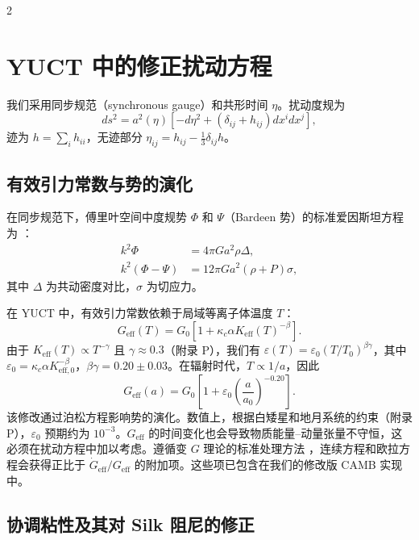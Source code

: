 \documentclass[11pt,a4paper]{article}
\begin{document}
\begin{multicols}{2}
		\section{YUCT 中的修正扰动方程}
		
		我们采用同步规范（synchronous gauge）和共形时间 $\eta$。扰动度规为
		\begin{equation}
			ds^2 = a^2(\eta)\left[ -d\eta^2 + (\delta_{ij} + h_{ij}) dx^i dx^j \right],
		\end{equation}
		迹为 $h = \sum_i h_{ii}$，无迹部分 $\eta_{ij} = h_{ij} - \frac{1}{3}\delta_{ij}h$。
		
		\subsection{有效引力常数与势的演化}
		
		在同步规范下，傅里叶空间中度规势 $\Phi$ 和 $\Psi$（Bardeen 势）的标准爱因斯坦方程为 \cite{Ma1995}：
		\begin{align}
			k^2 \Phi &= 4\pi G a^2 \rho \Delta, \\
			k^2 (\Phi - \Psi) &= 12\pi G a^2 (\rho+P) \sigma,
		\end{align}
		其中 $\Delta$ 为共动密度对比，$\sigma$ 为切应力。
		
		在 YUCT 中，有效引力常数依赖于局域等离子体温度 $T$：
		\begin{equation}
			G_{\mathrm{eff}}(T) = G_0\left[1 + \kappa_c \alpha K_{\mathrm{eff}}(T)^{-\beta}\right].
			\label{eq:Geff}
		\end{equation}
		由于 $K_{\mathrm{eff}}(T) \propto T^{-\gamma}$ 且 $\gamma \approx 0.3$（附录 P），我们有 $\varepsilon(T) = \varepsilon_0 (T/T_0)^{\beta\gamma}$，其中 $\varepsilon_0 = \kappa_c \alpha K_{\mathrm{eff},0}^{-\beta}$，$\beta\gamma = 0.20 \pm 0.03$。在辐射时代，$T \propto 1/a$，因此
		\begin{equation}
			G_{\mathrm{eff}}(a) = G_0\left[1 + \varepsilon_0 \left(\frac{a}{a_0}\right)^{-0.20}\right].
			\label{eq:Geff_a}
		\end{equation}
		该修改通过泊松方程影响势的演化。数值上，根据白矮星和地月系统的约束（附录 P），$\varepsilon_0$ 预期约为 $10^{-3}$。$G_{\mathrm{eff}}$ 的时间变化也会导致物质能量–动量张量不守恒，这必须在扰动方程中加以考虑。遵循变 $G$ 理论的标准处理方法 \cite{Uzan2011}，连续方程和欧拉方程会获得正比于 $\dot{G}_{\mathrm{eff}}/G_{\mathrm{eff}}$ 的附加项。这些项已包含在我们的修改版 CAMB 实现中。
		
		\subsection{协调粘性及其对 Silk 阻尼的修正}
		

\end{multicols}
\end{document}
